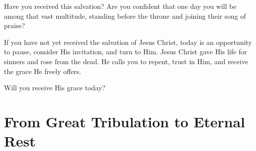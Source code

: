 \begin{ReaderQuestion}
Have you received this salvation? Are you confident that one day you will be among that vast multitude, standing before the throne and joining their song of praise?

If you have not yet received the salvation of Jesus Christ, today is an opportunity to pause, consider His invitation, and turn to Him. Jesus Christ gave His life for sinners and rose from the dead. He calls you to repent, trust in Him, and receive the grace He freely offers.

Will you receive His grace today?
\end{ReaderQuestion}



\section{From Great Tribulation to Eternal Rest}


